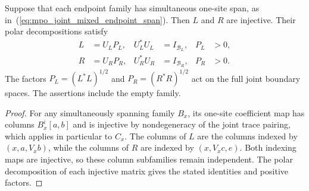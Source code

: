 \begin{lemma}
    \label{thm:mpo_joint_boundary_polar}
    \leanok
    Suppose that each endpoint family has simultaneous one-site span,
    as in~(\ref{eq:mpo_joint_mixed_endpoint_span}). Then $L$ and $R$ are
    injective. Their polar decompositions satisfy
    \begin{align}
        L & =U_LP_L, & U_L^*U_L & =I_{\mathcal B_L}, & P_L & >0, \\
        R & =U_RP_R, & U_R^*U_R & =I_{\mathcal B_R}, & P_R & >0.
    \end{align}
    The factors $P_L=(L^*L)^{1/2}$ and $P_R=(R^*R)^{1/2}$ act on the
    full joint boundary spaces. The assertions include the empty family.
\end{lemma}
\begin{proof}
    \leanok
    For any simultaneously spanning family $B_x$, its one-site
    coefficient map has columns $B_x^i[a,b]$ and is injective by
    nondegeneracy of the joint trace pairing, which applies in particular
    to $C_x$. The columns of $L$ are the columns indexed by
    $(x,a,V_xb)$, while the columns of $R$ are indexed by
    $(x,V_xc,e)$. Both indexing maps are injective, so these column
    subfamilies remain independent. The polar decomposition of each
    injective matrix gives the stated identities and positive factors.
\end{proof}

